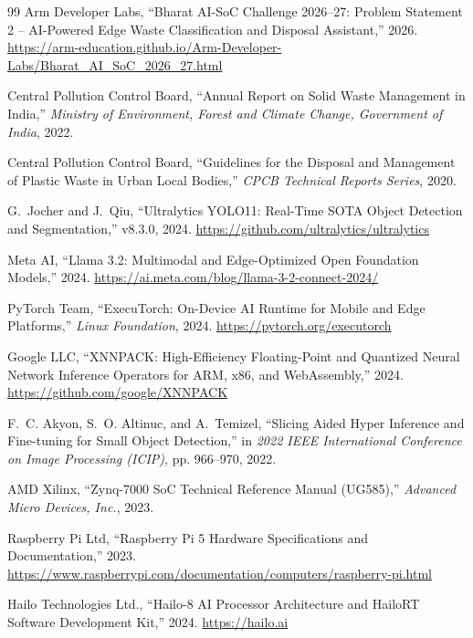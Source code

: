 \documentclass[12pt,a4paper]{article}
\begin{document}
\begin{thebibliography}{99}
Arm Developer Labs, ``Bharat AI-SoC Challenge 2026--27: Problem Statement 2 -- AI-Powered Edge Waste Classification and Disposal Assistant,'' 2026. \url{https://arm-education.github.io/Arm-Developer-Labs/Bharat_AI_SoC_2026_27.html}

Central Pollution Control Board, ``Annual Report on Solid Waste Management in India,'' \emph{Ministry of Environment, Forest and Climate Change, Government of India}, 2022.

Central Pollution Control Board, ``Guidelines for the Disposal and Management of Plastic Waste in Urban Local Bodies,'' \emph{CPCB Technical Reports Series}, 2020.

G.~Jocher and J.~Qiu, ``Ultralytics YOLO11: Real-Time SOTA Object Detection and Segmentation,'' v8.3.0, 2024. \url{https://github.com/ultralytics/ultralytics}

Meta AI, ``Llama 3.2: Multimodal and Edge-Optimized Open Foundation Models,'' 2024. \url{https://ai.meta.com/blog/llama-3-2-connect-2024/}

PyTorch Team, ``ExecuTorch: On-Device AI Runtime for Mobile and Edge Platforms,'' \emph{Linux Foundation}, 2024. \url{https://pytorch.org/executorch}

Google LLC, ``XNNPACK: High-Efficiency Floating-Point and Quantized Neural Network Inference Operators for ARM, x86, and WebAssembly,'' 2024. \url{https://github.com/google/XNNPACK}

F.~C. Akyon, S.~O. Altinuc, and A.~Temizel, ``Slicing Aided Hyper Inference and Fine-tuning for Small Object Detection,'' in \emph{2022 IEEE International Conference on Image Processing (ICIP)}, pp. 966--970, 2022.

AMD Xilinx, ``Zynq-7000 SoC Technical Reference Manual (UG585),'' \emph{Advanced Micro Devices, Inc.}, 2023.

Raspberry Pi Ltd, ``Raspberry Pi 5 Hardware Specifications and Documentation,'' 2023. \url{https://www.raspberrypi.com/documentation/computers/raspberry-pi.html}

Hailo Technologies Ltd., ``Hailo-8 AI Processor Architecture and HailoRT Software Development Kit,'' 2024. \url{https://hailo.ai}
\end{thebibliography}
\end{document}
